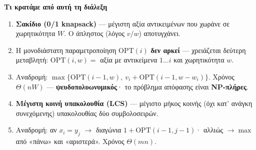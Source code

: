 \documentclass[11pt,a4paper]{article}
\begin{document}
\begin{recapbox}
\textbf{Τι κρατάμε από αυτή τη διάλεξη}
\begin{enumerate}
  \item \textbf{Σακίδιο (0/1 knapsack)} --- μέγιστη αξία αντικειμένων που χωράνε
  σε χωρητικότητα $W$. Ο άπληστος (λόγος $v/w$) αποτυγχάνει.
  \item Η μονοδιάστατη παραμετροποίηση $\text{OPT}(i)$ \textbf{δεν αρκεί} ---
  χρειάζεται δεύτερη μεταβλητή: $\text{OPT}(i, w) = $ αξία με αντικείμενα
  $1 \dots i$ και χωρητικότητα $w$.
  \item Αναδρομή: $\max\{\text{OPT}(i-1,w),\ v_i + \text{OPT}(i-1,w-w_i)\}$.
  Χρόνος $\Theta(nW)$ --- \textbf{ψευδοπολυωνυμικός}· το πρόβλημα απόφασης είναι
  \textbf{NP-πλήρες}.
  \item \textbf{Μέγιστη κοινή υπακολουθία (LCS)} --- μέγιστο μήκος κοινής (όχι
  κατ' ανάγκη συνεχόμενης) υπακολουθίας δύο συμβολοσειρών.
  \item Αναδρομή: αν $x_i = y_j$ $\to$ διαγώνια $1 + \text{OPT}(i-1,j-1)$·
  αλλιώς $\to \max$ από «πάνω» και «αριστερά». Χρόνος $\Theta(mn)$.
\end{enumerate}
\end{recapbox}

\lecturefooter
\end{document}
